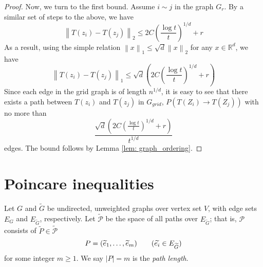 \documentclass{article}
\newcommand{\Reals}{\mathbb{R}}
\newcommand{\norm}[1]{\left\lVert#1\right\rVert}
\newcommand{\abs}[1]{\left \lvert #1 \right \rvert}
\newcommand{\1}{\mathbb{I}}
\newcommand{\Rd}{\Reals^d}
\theoremstyle{alden}
\theoremstyle{aldenthm}
\theoremstyle{definition}
\theoremstyle{remark}
\begin{document}
\begin{proof}
	Now, we turn to the first bound. Assume $i \sim j$ in the graph $G_r$. By a similar set of steps to the above, we have
	\begin{equation*}
	\norm{T(z_i) - T(z_j)}_2 \leq 2C\left(\frac{\log t}{t}\right)^{1/d} + r
	\end{equation*}
	As a result, using the simple relation $\norm{x}_1 \leq \sqrt{d} \norm{x}_2$ for any $x \in \Rd$, we have
	\begin{equation*}
	\norm{T(z_i) - T(z_j)}_1 \leq \sqrt{d}(2C\left(\frac{\log t}{t}\right)^{1/d} + r)
	\end{equation*}
	Since each edge in the grid graph is of length $n^{1/d}$, it is easy to see that there exists a path between $T(z_i)$ and $T(z_j)$ in $G_{grid}$, $P(T(Z_i) \to T(Z_j))$ with no more than
	\begin{equation*}
	\frac{\sqrt{d}(2C\left(\frac{\log t}{t}\right)^{1/d} + r)}{t^{1/d}}
	\end{equation*}
	edges. The bound follows by Lemma \ref{lem: graph_ordering}.
\end{proof}

\section{Poincare inequalities}

Let $G$ and $\widetilde{G}$ be undirected, unweighted graphs over vertex set $V$, with edge sets $E_G$ and $E_{\widetilde{G}}$, respectively. Let $\widetilde{\mathcal{P}}$ be the space of all paths over $E_{\widetilde{G}}$; that is, $\mathcal{P}$ consists of $\widetilde{P} \in \widetilde{\mathcal{P}}$
\begin{equation*}
P = (\widetilde{e}_1, \ldots, \widetilde{e}_m) \tag{$\widetilde{e_i} \in E_{\widetilde{G}}$}
\end{equation*}
for some integer $m \geq 1$. We say $\abs{P} = m$ is the \emph{path length}.
\end{document}
